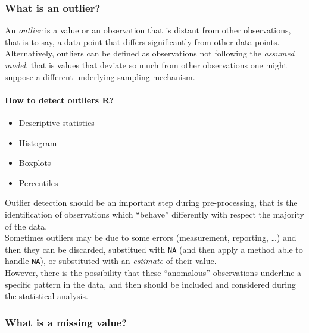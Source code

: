 \documentclass[
]{article}
\providecommand{\tightlist}{%
  \setlength{\itemsep}{0pt}\setlength{\parskip}{0pt}}
\begin{document}
\hypertarget{what-is-an-outlier}{%
\subsubsection{What is an outlier?}\label{what-is-an-outlier}}

An \emph{outlier} is a value or an observation that is distant from
other observations, that is to say, a data point that differs
significantly from other data points. Alternatively, outliers can be
defined as observations not following the \emph{assumed model}, that is
values that deviate so much from other observations one might suppose a
different underlying sampling mechanism.

\hypertarget{how-to-detect-outliers-r}{%
\paragraph{How to detect outliers R?}\label{how-to-detect-outliers-r}}

\begin{itemize}
\tightlist
\item
  Descriptive statistics
\item
  Histogram
\item
  Boxplots
\item
  Percentiles
\end{itemize}

Outlier detection should be an important step during pre-processing,
that is the identification of observations which ``behave'' differently
with respect the majority of the data.\\
Sometimes outliers may be due to some errors (measurement, reporting,
\ldots) and then they can be discarded, substitued with \texttt{NA} (and
then apply a method able to handle \texttt{NA}), or substituted with an
\emph{estimate} of their value.\\
However, there is the possibility that these ``anomalous'' observations
underline a specific pattern in the data, and then should be included
and considered during the statistical analysis.

\hypertarget{what-is-a-missing-value}{%
\subsubsection{What is a missing value?}\label{what-is-a-missing-value}}
\end{document}
